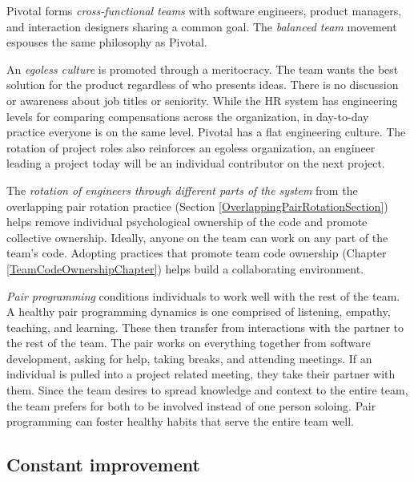 Pivotal forms \textit{cross-functional teams} with software engineers, product managers, and interaction designers sharing a common goal. The \textit{balanced team} movement espouses the same philosophy as Pivotal.


An \textit{egoless culture} is promoted through a meritocracy. The team wants the best solution for the product regardless of who presents ideas.  There is no discussion or awareness about job titles or seniority. While the HR system has engineering levels for comparing compensations across the organization, in day-to-day practice everyone is on the same level. Pivotal has a flat engineering culture.  The rotation of project roles also reinforces an egoless organization, an engineer leading a project today will be an individual contributor on the next project. 


The \textit{rotation of engineers through different parts of the system} from the overlapping pair rotation practice (Section \ref{OverlappingPairRotationSection}) helps remove individual psychological ownership of the code and promote collective ownership. Ideally, anyone on the team can work on any part of the team's code. Adopting practices that promote team code ownership (Chapter \ref{TeamCodeOwnershipChapter}) helps build a collaborating environment.


\textit{Pair programming} conditions individuals to work well with the rest of the team. A healthy pair programming dynamics is one comprised of listening, empathy, teaching, and learning. These then transfer from interactions with the partner to the rest of the team. The pair works on everything together from software development, asking for help, taking breaks, and attending meetings. If an individual is pulled into a project related meeting, they take their partner with them. Since the team desires to spread knowledge and context to the entire team, the team prefers for both to be involved instead of one person soloing.  Pair programming can foster healthy habits that serve the entire team well.


\subsection{Constant improvement}


